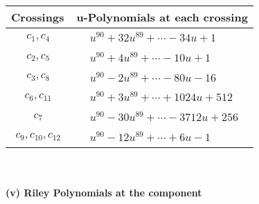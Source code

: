 \documentclass[1p]{elsarticle_modified}
\theoremstyle{definition}
\begin{document}
\begin{tabular}{m{50pt}|m{274pt}}
Crossings & \hspace{64pt}u-Polynomials at each crossing \\
\hline $$\begin{aligned}c_{1},c_{4}\end{aligned}$$&$\begin{aligned}
&u^{90}+32 u^{89}+\cdots-34 u+1
\end{aligned}$\\
\hline $$\begin{aligned}c_{2},c_{5}\end{aligned}$$&$\begin{aligned}
&u^{90}+4 u^{89}+\cdots-10 u+1
\end{aligned}$\\
\hline $$\begin{aligned}c_{3},c_{8}\end{aligned}$$&$\begin{aligned}
&u^{90}-2 u^{89}+\cdots-80 u-16
\end{aligned}$\\
\hline $$\begin{aligned}c_{6},c_{11}\end{aligned}$$&$\begin{aligned}
&u^{90}+3 u^{89}+\cdots+1024 u+512
\end{aligned}$\\
\hline $$\begin{aligned}c_{7}\end{aligned}$$&$\begin{aligned}
&u^{90}-30 u^{89}+\cdots-3712 u+256
\end{aligned}$\\
\hline $$\begin{aligned}c_{9},c_{10},c_{12}\end{aligned}$$&$\begin{aligned}
&u^{90}-12 u^{89}+\cdots+6 u-1
\end{aligned}$\\
\hline
\end{tabular}\\~\\
\newpage\renewcommand{\arraystretch}{1}
\flushleft \textbf{(v) Riley Polynomials at the component}\newline \\
\end{document}
